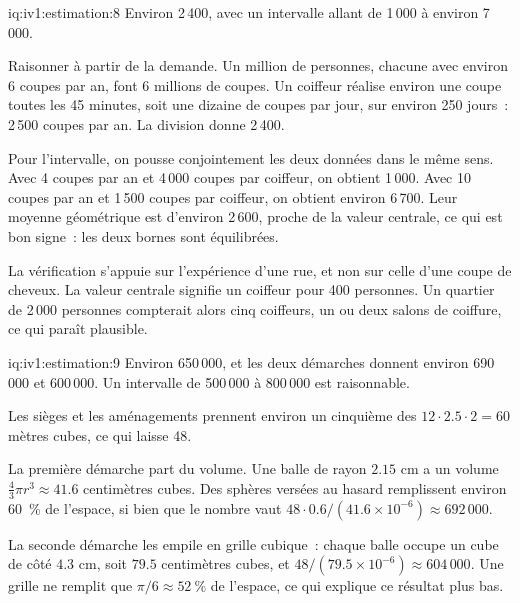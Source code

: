 \begin{solution}{iq:iv1:estimation:8}
Environ 2\,400, avec un intervalle allant de 1\,000 à environ 7\,000.

Raisonner à partir de la demande. Un million de personnes, chacune avec environ 6 coupes par an, font 6 millions de coupes. Un coiffeur réalise environ une coupe toutes les 45 minutes, soit une dizaine de coupes par jour, sur environ 250 jours~: 2\,500 coupes par an. La division donne 2\,400.

Pour l'intervalle, on pousse conjointement les deux données dans le même sens. Avec 4 coupes par an et 4\,000 coupes par coiffeur, on obtient 1\,000. Avec 10 coupes par an et 1\,500 coupes par coiffeur, on obtient environ 6\,700. Leur moyenne géométrique est d'environ 2\,600, proche de la valeur centrale, ce qui est bon signe~: les deux bornes sont équilibrées.

La vérification s'appuie sur l'expérience d'une rue, et non sur celle d'une coupe de cheveux. La valeur centrale signifie un coiffeur pour 400 personnes. Un quartier de 2\,000 personnes compterait alors cinq coiffeurs, un ou deux salons de coiffure, ce qui paraît plausible.

\end{solution}

\begin{solution}{iq:iv1:estimation:9}
Environ 650\,000, et les deux démarches donnent environ 690\,000 et 600\,000. Un intervalle de 500\,000 à 800\,000 est raisonnable.

Les sièges et les aménagements prennent environ un cinquième des $12 \cdot 2.5 \cdot 2 = 60$ mètres cubes, ce qui laisse 48.

La première démarche part du volume. Une balle de rayon $2.15$ cm a un volume $\tfrac43 \pi r^3 \approx 41.6$ centimètres cubes. Des sphères versées au hasard remplissent environ 60~\% de l'espace, si bien que le nombre vaut $48 \cdot 0.6/(41.6 \times 10^{-6}) \approx 692\,000$.

La seconde démarche les empile en grille cubique~: chaque balle occupe un cube de côté $4.3$ cm, soit $79.5$ centimètres cubes, et $48/(79.5 \times 10^{-6}) \approx 604\,000$. Une grille ne remplit que $\pi/6 \approx 52~\%$ de l'espace, ce qui explique ce résultat plus bas.

\end{solution}


